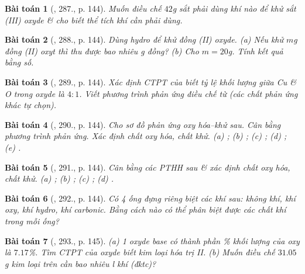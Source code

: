 \documentclass{article}
\newtheorem{baitoan}{Bài toán}
\begin{document}
\begin{baitoan}[\cite{An_400_BT_Hoa_Hoc_8_2020}, 287., p. 144]
	Muốn điều chế $42$\emph{g} sắt phải dùng khí nào để khử sắt (III) oxyde \& cho biết thể tích khí cần phải dùng.
\end{baitoan}

\begin{baitoan}[\cite{An_400_BT_Hoa_Hoc_8_2020}, 288., p. 144]
	Dùng hydro để khử đồng (II) oxyde. (a) Nếu khử $m$\emph{g} đồng (II) oxyt thì thu được bao nhiêu \emph{g} đồng? (b) Cho $m = 20$\emph{g}. Tính kết quả bằng số.
\end{baitoan}

\begin{baitoan}[\cite{An_400_BT_Hoa_Hoc_8_2020}, 289., p. 144]
	Xác định CTPT của \emph{} biết tỷ lệ khối lượng giữa \emph{Cu} \& \emph{O} trong oxyde là $4:1$. Viết phương trình phản ứng điều chế \emph{} từ \emph{} (các chất phản ứng khác tự chọn).
\end{baitoan}

\begin{baitoan}[\cite{An_400_BT_Hoa_Hoc_8_2020}, 290., p. 144]
	Cho sơ đồ phản ứng oxy hóa--khử sau. Cân bằng phương trình phản ứng. Xác định chất oxy hóa, chất khử. (a) \emph{}; (b) \emph{}; (c) \emph{}; (d) \emph{}; (e) \emph{}.
\end{baitoan}

\begin{baitoan}[\cite{An_400_BT_Hoa_Hoc_8_2020}, 291., p. 144]
	Cân bằng các PTHH sau \& xác định chất oxy hóa, chất khử. (a) \emph{}; (b) \emph{}; (c) \emph{}; (d) \emph{}.
\end{baitoan}

\begin{baitoan}[\cite{An_400_BT_Hoa_Hoc_8_2020}, 292., p. 144]
	Có 4 ống đựng riêng biệt các khí sau: không khí, khí oxy, khí hydro, khí carbonic. Bằng cách nào có thể phân biệt được các chất khí trong mỗi ống?
\end{baitoan}

\begin{baitoan}[\cite{An_400_BT_Hoa_Hoc_8_2020}, 293., p. 145]
	(a) 1 oxyde base có thành phần \% khối lượng của oxy là $7.17$\%. Tìm CTPT của oxyde biết kim loại hóa trị II. (b) Muốn điều chế $31.05$\emph{g} kim loại trên cần bao nhiêu \emph{l} khí \emph{} (đktc)?
\end{baitoan}
\end{document}
